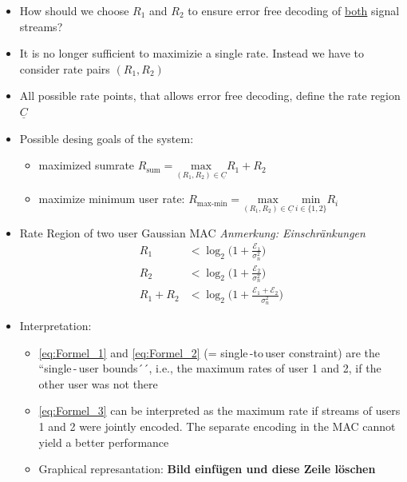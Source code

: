 \documentclass[a4paper, 10pt]{article}
\begin{document}
\begin{itemize}
	\item How should we choose $R_1 $ and $R_2 $ to ensure error free decoding of \underline{both} signal streams?
	\item It is no longer sufficient to maximizie a single rate. Instead we have to consider rate pairs $(R_1, R_2)$
	\item All possible rate points, that allows error free decoding, define the rate region $\underline{C} $
	\item Possible desing goals of the system:
	\begin{itemize}
		\item maximized sumrate $R_{\text{sum}} = \underset{(R_1, R_2) \in \underline{C}}{\text{max}} R_1 + R_2 $ 
		\item maximize minimum user rate: $R_{\text{max-min}} = \underset{(R_1, R_2) \in \underline{C}}{\text{max}} \, \underset{i \in \{1, 2\}}{\text{min}} R_i $ 
	\end{itemize}
	\item Rate Region of two user Gaussian MAC \quad\textit{Anmerkung: Einschr\"ankungen}
	\begin{align}
		R_1 &< \log_2\bigl(1 + \frac{\mathcal{E}_1}{\sigma_n^2}\bigr) \label{eq:Formel_1}\\ 
		R_2 &< \log_2\bigl(1 + \frac{\mathcal{E}_2}{\sigma_n^2}\bigr)\label{eq:Formel_2} \\ 
		R_1 + R_2 &< \log_2\bigl(1 + \frac{\mathcal{E}_1 + \mathcal{E}_2}{\sigma_n^2}\bigr) 	\label{eq:Formel_3}	
	\end{align}
	\item Interpretation:
	\begin{itemize}
		\item \eqref{eq:Formel_1} and \eqref{eq:Formel_2}  (= single\,-to\,user constraint) are the ``single\,-\,user bounds´´, i.e., the maximum rates of user 1 and 2, if the other user was not there
		\item \eqref{eq:Formel_3} can be interpreted as the maximum rate if streams of users 1 and 2 were jointly encoded. The separate encoding in the MAC cannot yield a better performance
		\item Graphical represantation: \textbf{Bild einf\"ugen und diese Zeile l\"oschen}
	\end{itemize}
\end{itemize}
\end{document}
